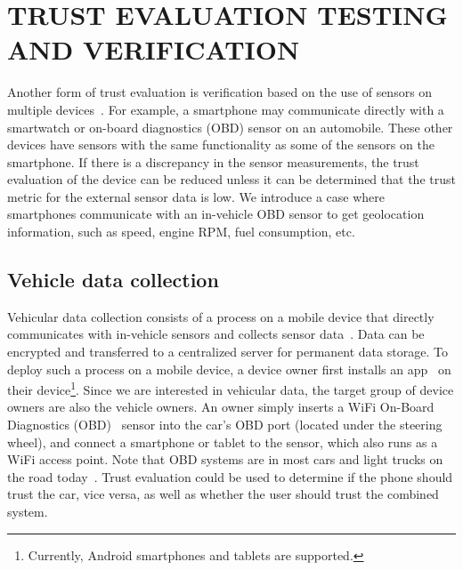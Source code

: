 \section{TRUST EVALUATION TESTING AND VERIFICATION}
\label{sec:geolocation}
Another form of trust evaluation is verification based on the use of sensors on multiple devices~\cite{ju2012neteye}.  For example,
a smartphone may communicate directly with a smartwatch or on-board diagnostics (OBD)
sensor on an automobile.  These other devices have sensors with the same
functionality as some of the sensors on the smartphone.  If there is a discrepancy in the sensor measurements, 
the trust evaluation of the device can be reduced unless it can be determined that the trust metric for the 
external sensor data is low.
We introduce a case where smartphones communicate with an in-vehicle OBD sensor
to get geolocation information, such as speed, engine RPM, fuel consumption, 
etc.

\subsection{Vehicle data collection}

Vehicular data collection consists of a process on a mobile 
device that directly communicates with in-vehicle sensors and collects sensor 
data~\cite{sensor}. Data can be encrypted and transferred to a
centralized server for permanent data storage. 
To deploy such a process on a mobile device, a device owner first installs an
app~\cite{sensor-app} on their device\footnote{Currently, Android smartphones 
and tablets are supported.}. Since we are interested in
vehicular data, the target group of device owners are also the vehicle 
owners. An owner simply inserts a WiFi On-Board Diagnostics 
(OBD)~\cite{obd} sensor into the car's OBD port (located under the steering wheel),  
and connect a 
smartphone or tablet to the sensor, which also runs as a WiFi access 
point. Note that OBD systems are in most cars and light trucks 
on the road today~\cite{obdconnector}. 
Trust evaluation could be used to determine if the phone should trust the car,
vice versa, as well as whether the user should trust the combined system.

